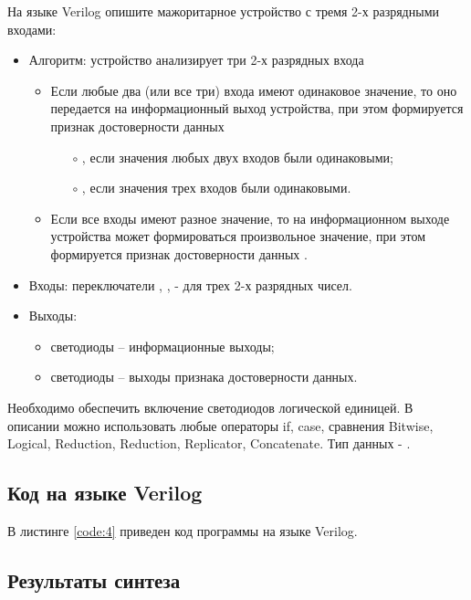 На языке Verilog опишите мажоритарное устройство с тремя 2-х разрядными входами:
\begin{itemize}
	\item Алгоритм: устройство анализирует три 2-х разрядных входа
		\begin{itemize}
			\item Если любые два (или все три) входа имеют одинаковое значение, то оно передается на информационный выход устройства, при этом формируется признак достоверности данных
				\begin{itemize}
					\item[$\circ$] , если значения любых двух входов были одинаковыми;
					\item[$\circ$] , если значения трех входов были одинаковыми.
				\end{itemize}
			\item Если все входы имеют разное значение, то на информационном выходе устройства может формироваться произвольное значение, при этом формируется признак достоверности данных .
		\end{itemize}
	\item Входы: переключатели , ,  - для трех 2-х разрядных чисел.
	\item Выходы:
		\begin{itemize}
			\item светодиоды  -- информационные выходы;
			\item светодиоды  -- выходы признака достоверности данных.
		\end{itemize}
\end{itemize}

Необходимо обеспечить включение светодиодов логической единицей. В описании можно использовать любые операторы if, case, сравнения Bitwise, Logical, Reduction, Reduction, Replicator, Concatenate. Тип данных - .

\subsection{Код на языке Verilog}

В листинге \ref{code:4} приведен код программы на языке Verilog.



\subsection{Результаты синтеза}

